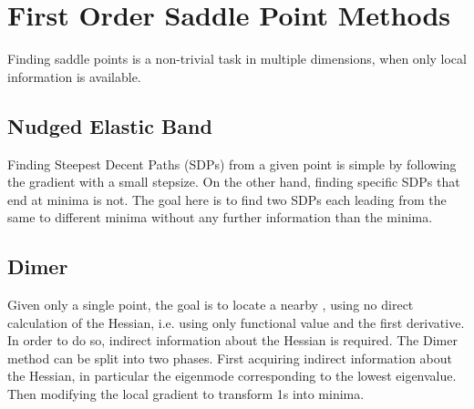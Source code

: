 \section{First Order Saddle Point Methods}
\label{sec:sps}

Finding saddle points is a non-trivial task in multiple dimensions, when only local information is available.

\incomplete

\subsection{Nudged Elastic Band}
\label{sec:neb}

Finding Steepest Decent Paths (SDPs) from a given point is simple by following the gradient with a small stepsize.
On the other hand, finding specific SDPs that end at minima is not.
The goal here is to find two SDPs each leading from the same  to different minima without any further information than the minima.


\incomplete

\subsection{Dimer}
\label{sec:dimer}

Given only a single point, the goal is to locate a nearby , using no direct calculation of the Hessian, i.e. using only functional value and the first derivative.
In order to do so, indirect information about the Hessian is required.
The Dimer method can be split into two phases.
First acquiring indirect information about the Hessian, in particular the eigenmode corresponding to the lowest eigenvalue.
Then modifying the local gradient to transform \sap1s into minima.

\incomplete
